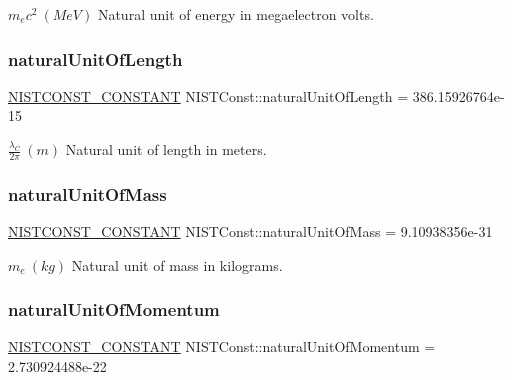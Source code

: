 $m_e c^2 \ (MeV)$ Natural unit of energy in megaelectron volts. \mbox{\label{group___n_i_s_t_const-_natural_unit_ga746fb3dd81ed728c99e5f78ccbc3c15f}} 
\subsubsection{\texorpdfstring{natural\+Unit\+Of\+Length}{naturalUnitOfLength}}
{\footnotesize\ttfamily \mbox{\hyperlink{group___n_i_s_t_const-_macros_ga2b0fc1d7452373f816175dd86ce26729}{N\+I\+S\+T\+C\+O\+N\+S\+T\+\_\+\+C\+O\+N\+S\+T\+A\+NT}} N\+I\+S\+T\+Const\+::natural\+Unit\+Of\+Length = 386.\+15926764e-\/15}

$\frac{\lambda_C}{2\pi} \ (m)$ Natural unit of length in meters. \mbox{\label{group___n_i_s_t_const-_natural_unit_gaf95361f1122cce12b7ad6fa77e75bcd5}} 
\subsubsection{\texorpdfstring{natural\+Unit\+Of\+Mass}{naturalUnitOfMass}}
{\footnotesize\ttfamily \mbox{\hyperlink{group___n_i_s_t_const-_macros_ga2b0fc1d7452373f816175dd86ce26729}{N\+I\+S\+T\+C\+O\+N\+S\+T\+\_\+\+C\+O\+N\+S\+T\+A\+NT}} N\+I\+S\+T\+Const\+::natural\+Unit\+Of\+Mass = 9.\+10938356e-\/31}

$m_e \ (kg)$ Natural unit of mass in kilograms. \mbox{\label{group___n_i_s_t_const-_natural_unit_ga020a191050aee0f8de449b86901efcab}} 
\subsubsection{\texorpdfstring{natural\+Unit\+Of\+Momentum}{naturalUnitOfMomentum}}
{\footnotesize\ttfamily \mbox{\hyperlink{group___n_i_s_t_const-_macros_ga2b0fc1d7452373f816175dd86ce26729}{N\+I\+S\+T\+C\+O\+N\+S\+T\+\_\+\+C\+O\+N\+S\+T\+A\+NT}} N\+I\+S\+T\+Const\+::natural\+Unit\+Of\+Momentum = 2.\+730924488e-\/22}

